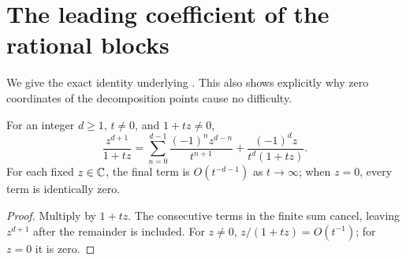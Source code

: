 \section{The leading coefficient of the rational blocks}\label{app:laurent}

We give the exact identity underlying . This also
shows explicitly why zero coordinates of the decomposition points
cause no difficulty.

\begin{lemma}\label{lem:division}
For an integer $d\ge1$, $t\ne0$, and $1+tz\ne0$,
\begin{equation}\label{eq:division}
\frac{z^{d+1}}{1+tz}
=\sum_{n=0}^{d-1}\frac{(-1)^n z^{d-n}}{t^{n+1}}
+\frac{(-1)^d z}{t^d(1+tz)}.
\end{equation}
For each fixed $z\in\mathbb C$, the final term is $O(t^{-d-1})$ as
$t\to\infty$; when $z=0$, every term is identically zero.
\end{lemma}
\begin{proof}
Multiply by $1+tz$. The consecutive terms in the finite sum
cancel, leaving $z^{d+1}$ after the remainder is included.
For $z\ne0$, $z/(1+tz)=O(t^{-1})$; for $z=0$ it is zero.
\end{proof}

